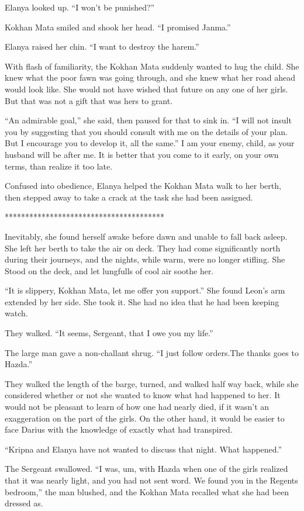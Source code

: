 \documentclass{article}
\begin{document}
	Elanya looked up. “I won’t be punished?”
	
	Kokhan Mata smiled and shook her head. “I promised Janma.”
	
	Elanya raised her chin. “I want to destroy the harem.”  
	
	With flash of familiarity, the Kokhan Mata suddenly wanted to hug the child. She knew what the poor fawn was going through, and she knew what her road ahead would look like. She would not have wished that future on any one of her girls. But that was not a gift that was hers to grant. 
	
	“An admirable goal,” she said, then paused for that to sink in. “I will not insult you by suggesting that you should consult with me on the details of your plan. But I encourage you to develop it, all the same.” I am your enemy, child, as your husband will be after me. It is better that you come to it early, on your own terms, than realize it too late.
	
	Confused into obedience, Elanya helped the Kokhan Mata walk to her berth, then stepped away to take a crack at the task she had been assigned.
	
	***************************************
	
	Inevitably, she found herself awake before dawn and unable to fall back asleep. She left her berth to take the air on deck. They had come significantly north during their journeys, and the nights, while warm, were no longer stifling. She Stood on the deck, and let lungfulls of cool air soothe her.
	
	“It is slippery, Kokhan Mata, let me offer you support.” She found Leon’s arm extended by her side. She took it. She had no idea that he had been keeping watch.
	
	They walked. “It seems, Sergeant, that I owe you my life.”
	
	The large man gave a non-challant shrug. “I just follow orders.The thanks goes to Hazda.”
	
	They walked the length of the barge, turned, and walked half way back, while she considered whether or not she wanted to know what had happened to her. It would not be pleasant to learn of how one had nearly died, if it wasn’t an exaggeration on the part of the girls. On the other hand, it would be easier to face Darius with the knowledge of exactly what had transpired.
	
	“Kripna and Elanya have not wanted to discuss that night. What happened.” 
	
	The Sergeant swallowed. “I was, um, with Hazda when one of the girls realized that it was nearly light, and you had not sent word. We found you in the Regents bedroom,” the man blushed, and the Kokhan Mata recalled what she had been dressed as.
	
\end{document}
